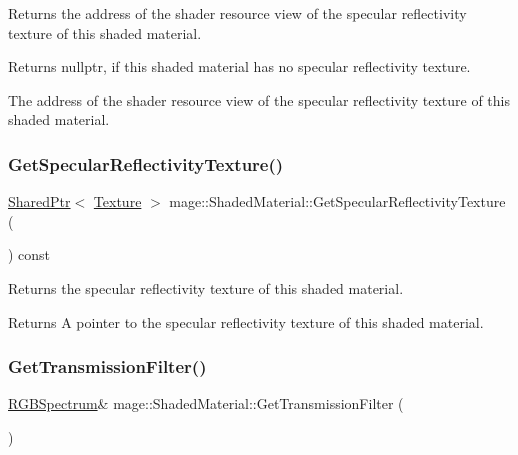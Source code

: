 Returns the address of the shader resource view of the specular reflectivity texture of this shaded material.

\begin{DoxyReturn}{Returns}
{\ttfamily nullptr}, if this shaded material has no specular reflectivity texture. 

The address of the shader resource view of the specular reflectivity texture of this shaded material. 
\end{DoxyReturn}
\hypertarget{structmage_1_1_shaded_material_aabf7fea125dfdf4d97537f22e0003a9e}{}\label{structmage_1_1_shaded_material_aabf7fea125dfdf4d97537f22e0003a9e} 
\subsubsection{\texorpdfstring{Get\+Specular\+Reflectivity\+Texture()}{GetSpecularReflectivityTexture()}}
{\footnotesize\ttfamily \hyperlink{namespacemage_a1e01ae66713838a7a67d30e44c67703e}{Shared\+Ptr}$<$ \hyperlink{classmage_1_1_texture}{Texture} $>$ mage\+::\+Shaded\+Material\+::\+Get\+Specular\+Reflectivity\+Texture (\begin{DoxyParamCaption}{ }\end{DoxyParamCaption}) const\hspace{0.3cm}{\ttfamily [noexcept]}}

Returns the specular reflectivity texture of this shaded material.

\begin{DoxyReturn}{Returns}
A pointer to the specular reflectivity texture of this shaded material. 
\end{DoxyReturn}
\hypertarget{structmage_1_1_shaded_material_a6f7957db6f13954152ffb9b71644fe80}{}\label{structmage_1_1_shaded_material_a6f7957db6f13954152ffb9b71644fe80} 
\subsubsection{\texorpdfstring{Get\+Transmission\+Filter()}{GetTransmissionFilter()}\hspace{0.1cm}{\footnotesize\ttfamily [1/2]}}
{\footnotesize\ttfamily \hyperlink{structmage_1_1_r_g_b_spectrum}{R\+G\+B\+Spectrum}\& mage\+::\+Shaded\+Material\+::\+Get\+Transmission\+Filter (\begin{DoxyParamCaption}{ }\end{DoxyParamCaption})\hspace{0.3cm}{\ttfamily [noexcept]}}

